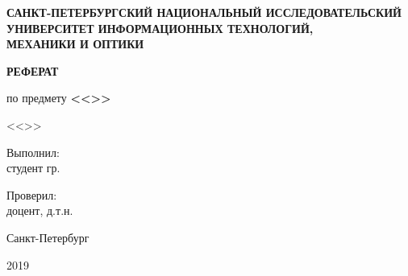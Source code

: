 \thispagestyle{empty}


\begin{center}
\textbf{САНКТ-ПЕТЕРБУРГСКИЙ НАЦИОНАЛЬНЫЙ ИССЛЕДОВАТЕЛЬСКИЙ\\ УНИВЕРСИТЕТ ИНФОРМАЦИОННЫХ ТЕХНОЛОГИЙ, \\МЕХАНИКИ И ОПТИКИ}
\end{center}


\vfill

\begin{center}
	\textbf{РЕФЕРАТ}
	
	по предмету \textbf{<<\Subject>>}
	
	<<\Theme>>
\end{center}

\vfill

\begin{flushright}
	Выполнил:\\
	студент гр. \Group\\
	\FullName
	
	Проверил:\\
	доцент, д.т.н. \Teacher
\end{flushright}

\vfill

\begin{center}
	Санкт-Петербург
	
	2019
\end{center}